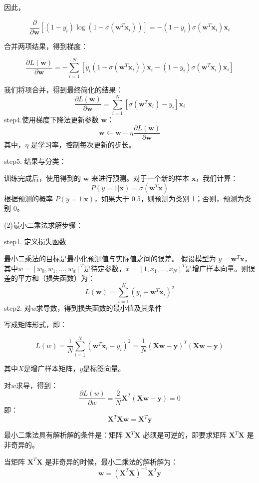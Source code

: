 \documentclass{article}
\begin{document}
因此，

\[
\frac{\partial}{\partial \mathbf{w}} \left[ (1 - y_i) \log(1 - \sigma(\mathbf{w}^T \mathbf{x}_i)) \right] = -(1 - y_i) \sigma(\mathbf{w}^T \mathbf{x}_i) \mathbf{x}_i
\]

合并两项结果，得到梯度：

\[
\frac{\partial L(\mathbf{w})}{\partial \mathbf{w}} = - \sum_{i=1}^{N} \left[ y_i \left( 1 - \sigma(\mathbf{w}^T \mathbf{x}_i) \right) \mathbf{x}_i - (1 - y_i) \sigma(\mathbf{w}^T \mathbf{x}_i) \mathbf{x}_i \right]
\]

我们将项合并，得到最终简化的结果：
\[
\frac{\partial L(\mathbf{w})}{\partial \mathbf{w}} = \sum_{i=1}^{N} \left[ \sigma(\mathbf{w}^T \mathbf{x}_i) - y_i \right] \mathbf{x}_i
\]
step4.使用梯度下降法更新参数 \( \mathbf{w} \)：
\[
\mathbf{w} \leftarrow \mathbf{w} - \eta \frac{\partial L(\mathbf{w})}{\partial \mathbf{w}}
\]
其中，\( \eta \) 是学习率，控制每次更新的步长。

step5. 结果与分类：

训练完成后，使用得到的 \( \mathbf{w} \) 来进行预测。对于一个新的样本 \( \mathbf{x} \)，我们计算：
\[
P(y = 1 | \mathbf{x}) = \sigma(\mathbf{w}^T \mathbf{x})
\]
根据预测的概率 \( P(y = 1 | \mathbf{x}) \)，如果大于 0.5，则预测为类别 1；否则，预测为类别 0。

(2)最小二乘法求解步骤：

step1. 定义损失函数

最小二乘法的目标是最小化预测值与实际值之间的误差。
假设模型为 \( y = \mathbf{w}^T \mathbf{x} \)，其中$w=[w_0,w_1,...,w_d]^T$是待定参数，$x=[1,x_1,...,x_N]^T$是增广样本向量。则误差的平方和（损失函数）为：
\[
L(\mathbf{w}) = \sum_{i=1}^{N} \left( y_i - \mathbf{w}^T \mathbf{x}_i  \right)^2
\]
step2. 对$w$求导数，得到损失函数的最小值及其条件

写成矩阵形式，即：

$$L(w)=\frac{1}{N}\sum_{i=1}^{N}(\mathbf{w}^T\mathbf{x}_i-y_i)^2=\frac{1}{N}(\mathbf{Xw}-\mathbf{y})^T(\mathbf{Xw}-\mathbf{y})$$

其中$X$是增广样本矩阵，$y$是标签向量。

对$w$求导，得到：
$$\frac{\partial L(w)}{\partial w}=\frac{2}{N}\mathbf{X}^T(\mathbf{Xw}-\mathbf{y})=0$$
即：$$\mathbf{X}^T\mathbf{Xw}=\mathbf{X}^T\mathbf{y}$$

最小二乘法具有解析解的条件是：矩阵 \( \mathbf{X}^T \mathbf{X} \) 必须是可逆的，即要求矩阵 \( \mathbf{X}^T \mathbf{X} \) 是非奇异的。

当矩阵 \( \mathbf{X}^T \mathbf{X} \) 是非奇异的时候，最小二乘法的解析解为：
$$\mathbf{w} = (\mathbf{X}^T \mathbf{X})^{-1} \mathbf{X}^T \mathbf{y}$$
\end{document}
